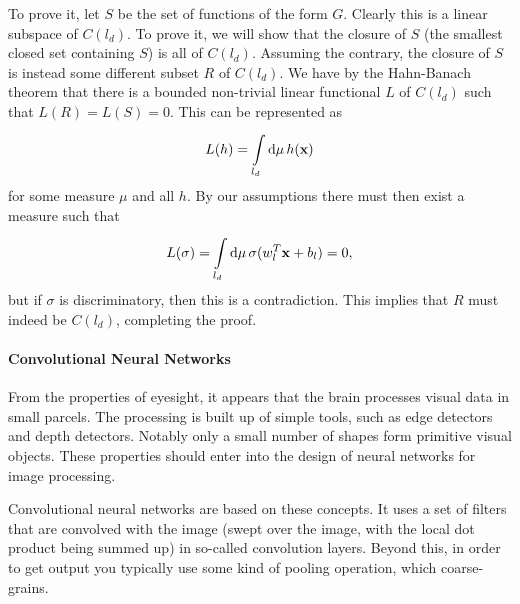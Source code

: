 To prove it, let $S$ be the set of functions of the form $G$. Clearly this is a linear subspace of $C(l_{d})$. To prove it, we will show that the closure of $S$ (the smallest closed set containing $S$) is all of $C(l_{d})$. Assuming the contrary, the closure of $S$ is instead some different subset $R$ of $C(l_{d})$. We have by the Hahn-Banach theorem that there is a bounded non-trivial linear functional $L$ of $C(l_{d})$ such that $L(R) = L(S) = 0$. This can be represented as
\begin{align*}
	L(h) = \int\limits_{l_{d}}^{}\dd{\mu}h(\vb{x})
\end{align*}
for some measure $\mu$ and all $h$. By our assumptions there must then exist a measure such that
\begin{align*}
	L(\sigma) = \int\limits_{l_{d}}^{}\dd{\mu}\sigma(w_{l}^{T}\vb{x} + b_{l}) = 0,
\end{align*}
but if $\sigma$ is discriminatory, then this is a contradiction. This implies that $R$ must indeed be $C(l_{d})$, completing the proof.

\paragraph{Convolutional Neural Networks}
From the properties of eyesight, it appears that the brain processes visual data in small parcels. The processing is built up of simple tools, such as edge detectors and depth detectors. Notably only a small number of shapes form primitive visual objects. These properties should enter into the design of neural networks for image processing.

Convolutional neural networks are based on these concepts. It uses a set of filters that are convolved with the image (swept over the image, with the local dot product being summed up) in so-called convolution layers. Beyond this, in order to get output you typically use some kind of pooling operation, which coarse-grains.